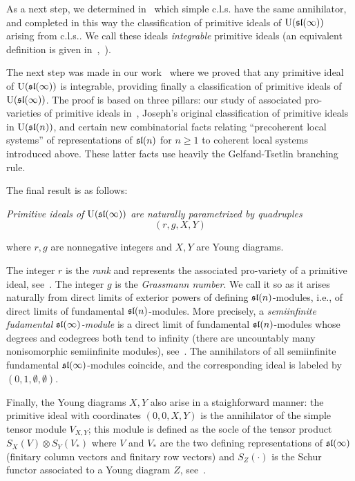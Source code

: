 \documentclass[10pt]{amsart}\oddsidemargin -1mm \evensidemargin -1mm \topmargin -15mm\headheight5mm \headsep 3.5mm \textheight 245mm\textwidth 170mm
\theoremstyle{definition}\newtheorem{theorem}{Theorem}[section]\newtheorem{lemma}[theorem]{Lemma}\newtheorem{remark}[theorem]{Remark}\newtheorem{proposition}[theorem]{Proposition}\newtheorem{corollary}[theorem]{Corollary}\newtheorem{definition}[theorem]{Definition}\newtheorem{Ex}[theorem]{Example}\newtheorem{obs}[theorem]{Observation}\newtheorem{nota}[theorem]{Notation}
\begin{document}
As a next step, we determined in~\cite{PP1} which simple c.l.s. have the same annihilator, and completed in this way the classification of primitive ideals of ${\rm U}(\frak{sl}(\infty))$ arising from c.l.s.. 
We call these ideals {\it integrable} primitive ideals (an equivalent definition is given in~\cite{PP1},~\cite{PP3}).

The next step was made in our work~\cite{PP5} where we proved  that any primitive ideal of ${\rm U}(\frak{sl}(\infty))$ is integrable, providing finally a classification of primitive ideals of ${\rm U}(\frak{sl}(\infty))$. 
The proof is based on three pillars:
our study of associated pro-varieties of primitive ideals in~\cite{PP1}, 
Joseph's original classification of primitive ideals in ${\rm U}(\frak{sl}(n))$,
and certain new combinatorial facts relating ``precoherent local systems'' of representations of $\frak{sl}(n)$ for $n\ge1$ to coherent local systems introduced above. 
These latter facts use heavily the Gelfand-Tsetlin branching rule.

The final result is as follows:

{\it Primitive ideals of ${\rm U}(\frak{sl}(\infty))$ are naturally parametrized by quadruples
$$(r, g, X, Y)$$

where $r, g$ are nonnegative integers and $X, Y$ are Young diagrams.}

The integer $r$ is the {\it rank} and represents the associated pro-variety of a primitive ideal, see~\cite{PP1}. 
The integer $g$ is the {\it Grassmann number}. 
We call it so as it arises naturally from direct limits of exterior powers of defining $\frak{sl}(n)$-modules, i.e., of direct limits of fundamental $\frak{sl}(n)$-modules. 
More precisely, a {\it semiinfinite fudamental $\frak{sl}(\infty)$-module} is a direct limit of fundamental $\frak{sl}(n)$-modules whose degrees and codegrees both tend to infinity (there are uncountably many nonisomorphic semiinfinite modules), see~\cite{GP}. 
The annihilators of all semiinfinite fundamental $\frak{sl}(\infty)$-modules coincide, and the corresponding ideal is labeled by $(0, 1, \emptyset, \emptyset)$. 

Finally, the Young diagrams ${X}, {Y}$ also arise in a staighforward manner: the primitive ideal with coordinates $(0, 0, {X}, {Y})$ is the annihilator of the simple tensor module $V_{{X}, {Y}}$; 
this module is defined as the socle  of the tensor product $S_{{X}}(V)\otimes S_{{Y}}(V_*)$ where $V$ and $V_*$ are the two defining representations of $\frak{sl}(\infty)$ (finitary column vectors and finitary row vectors) and $S_Z(\cdot)$ is the Schur functor associated to a Young diagram $Z$, see~\cite{DPSn}.
\end{document}
